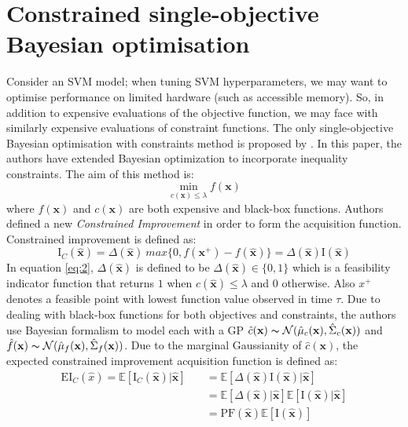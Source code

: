 \section{Constrained single-objective Bayesian optimisation}
Consider an SVM model; when tuning SVM hyperparameters, we may want to optimise performance on limited hardware (such as accessible memory). So, in addition to expensive evaluations of the objective function, we may face with similarly expensive evaluations of constraint functions. The only single-objective Bayesian optimisation with constraints method is proposed by \cite{gardner2014bayesian}. In this paper, the authors have extended Bayesian optimization to incorporate inequality constraints. The aim of this method is:
\begin{equation}
\operatorname*{min}_{c(\textbf{x}) \leq \lambda} f(\textbf{x})	
\label{eq:1}
\end{equation}
where $f(\textbf{x})$ and $c(\textbf{x})$ are both expensive and black-box functions. Authors defined a new \textit{Constrained Improvement} in order to form the acquisition function. Constrained improvement is defined as:
\begin{equation}
\mathrm{I}_C(\hat{\textbf{x}}) = \Delta(\hat{\textbf{x}})\ max\{0,f(\textbf{x}^{+})-f(\hat{\textbf{x}})\} = \Delta(\hat{\textbf{x}})\mathrm{I}(\hat{\textbf{x}})
\label{eq:2}
\end{equation}
In equation \ref{eq:2}, $\Delta(\hat{\textbf{x}})$ is defined to be $\Delta(\hat{\textbf{x}}) \in \{0,1\}$ which is a feasibility indicator function that returns $1$ when $c(\hat{\textbf{x}}) \leq \lambda$ and $0$ otherwise. Also $x^+$ denotes a feasible point with lowest function value observed in time $\tau$. Due to dealing with black-box functions for both objectives and constraints, the authors use Bayesian formalism to model each with a GP $\hat{c}(\textbf{x}) \thicksim
 \mathcal{N}(\hat{\mu}_{c}(\textbf{x}),\hat{\Sigma}_c(\textbf{x}))$ and $\hat{f}(\textbf{x}) \thicksim \mathcal{N}(\hat{\mu}_{f}(\textbf{x}),\hat{\Sigma}_f(\textbf{x}))$.
Due to the marginal Gaussianity of $\hat{c}(\textbf{x})$, the expected constrained improvement acquisition function is defined as:
\begin{equation}
\begin{split}
\mathrm{EI}_C(\hat{x}) = \mathbb{E}[\mathrm{I}_C(\hat{\textbf{x}})|\hat{\textbf{x}}]
		     		  & \quad = \mathbb{E}[\Delta(\hat{\textbf{x}})\mathrm{I}(\hat{\textbf{x}})|\hat{\textbf{x}}]\\
					  & \quad = \mathbb{E}[\Delta(\hat{\textbf{x}})|\hat{\textbf{x}}]\mathbb{E}[\mathrm{I}(\hat{\textbf{x}})|\hat{\textbf{x}}]\\
   					  & \quad = \mathrm{PF}(\hat{\textbf{x}})\mathbb{E}[\mathrm{I}(\hat{\textbf{x}})]
\end{split}
\label{eq:3}
\end{equation}
